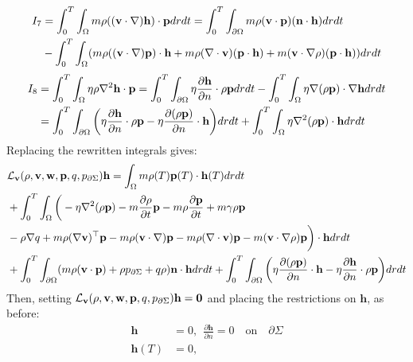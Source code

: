 \begin{align*}
I_7&=\int_0^T \int_\Omega m \rho ((\mathbf{v} \cdot \nabla)\mathbf{h}) \cdot \mathbf{p} dr dt
= \int_0^T \int_{\partial \Omega} m \rho (\mathbf{v} \cdot \mathbf{p})(\mathbf{n} \cdot \mathbf{h})dr dt \\
&- \int_0^T \int_\Omega (m \rho ((\mathbf{v} \cdot \nabla)\mathbf{p})\cdot \mathbf{h} + m \rho (\nabla \cdot \mathbf{v})(\mathbf{p} \cdot \mathbf{h}) + m (\mathbf{v} \cdot \nabla \rho)(\mathbf{p} \cdot \mathbf{h}))drdt
\end{align*}
\begin{align*}
I_8 &= \int_0^T \int_\Omega \eta \rho \nabla^2 \mathbf{h} \cdot \mathbf{p} = \int_0^T \int_{\partial \Omega} \eta \frac{\partial \mathbf{h}}{\partial n}  \cdot \rho \mathbf{p} dr dt - \int_0^T \int_\Omega \eta \nabla (\rho \mathbf{p}) \cdot \nabla\mathbf{h} dr dt\\
& = \int_0^T \int_{\partial \Omega} \bigg( \eta \frac{\partial \mathbf{h}}{\partial n} \cdot \rho \mathbf{p}  - \eta \frac{\partial (\rho \mathbf{p})}{\partial n} \cdot \mathbf{h}  \bigg)dr dt + \int_0^T \int_\Omega \eta \nabla^2 (\rho \mathbf{p}) \cdot \mathbf{h} dr dt
\end{align*}
Replacing the rewritten integrals gives:
\begin{align*}
&\mathcal{L}_{\mathbf{v}}(\rho,\mathbf{v},\mathbf{w},\mathbf{p},q,{p}_{\partial \Sigma}) \mathbf{h} = \int_\Omega m \rho(T) \mathbf{p}(T) \cdot \mathbf{h}(T) dr dt\\
&+\int_0^T \int_\Omega 
\bigg( - \eta\nabla^2 (\rho \mathbf{p}) - m \frac{\partial \rho}{\partial t} \mathbf{p}  -  m\rho \frac{\partial \mathbf{p}}{\partial t} +m \gamma \rho \mathbf{p}\\
&-\rho\nabla q +m \rho (\nabla \mathbf{v})^\top\mathbf{p} 
-m \rho (\mathbf{v} \cdot \nabla)\mathbf{p} - m \rho (\nabla \cdot \mathbf{v})\mathbf{p}  - m (\mathbf{v} \cdot \nabla \rho)\mathbf{p}  \bigg)\cdot  \mathbf{h} drdt\\
& +\int_0^T \int_{\partial\Omega} ( m \rho (\mathbf{v} \cdot \mathbf{p})+\rho  {p}_{\partial \Sigma} + q \rho)  \mathbf{n}\cdot \mathbf{h} dr dt + \int_0^T \int_{\partial \Omega} \bigg(\eta \frac{\partial (\rho \mathbf{p})}{\partial n} \cdot \mathbf{h} - \eta \frac{\partial \mathbf{h}}{\partial n} \cdot \rho \mathbf{p}    \bigg)dr dt\\
\end{align*}
Then, setting $\mathcal{L}_{\mathbf{v}}(\rho,\mathbf{v},\mathbf{w},\mathbf{p},q,{p}_{\partial \Sigma}) \mathbf{h}=\mathbf{0}$ and placing the restrictions on $\mathbf{h}$, as before:
\begin{align*}
\mathbf{h}&=0, \ \ \frac{\partial \mathbf{h}}{\partial n} = 0 \quad \text{on} \quad \partial \Sigma\\
\mathbf{h}(T)&=0,
\end{align*}
